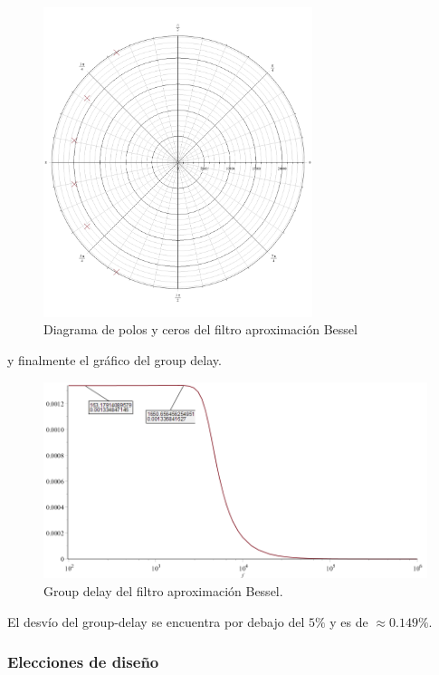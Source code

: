 \begin{figure}[H]
\centering
	\centering
	\includegraphics[width=0.7\textwidth]{Imagenes-Ej1/bessel_poles.png}
	\caption{Diagrama de polos y ceros del filtro aproximación Bessel}
	\label{leg_poles}
\end{figure}

y finalmente el gráfico del group delay.

\begin{figure}[H]
\centering
	\centering
	\includegraphics[width=\textwidth]{Imagenes-Ej1/groupdelay_calc.png}
	\caption{Group delay del filtro aproximación Bessel.}
	\label{bes_group_calc}
\end{figure}

El desvío del group-delay se encuentra por debajo del $5\%$ y es de $\approx 0.149\%$.

\subsubsection{Elecciones de diseño}


